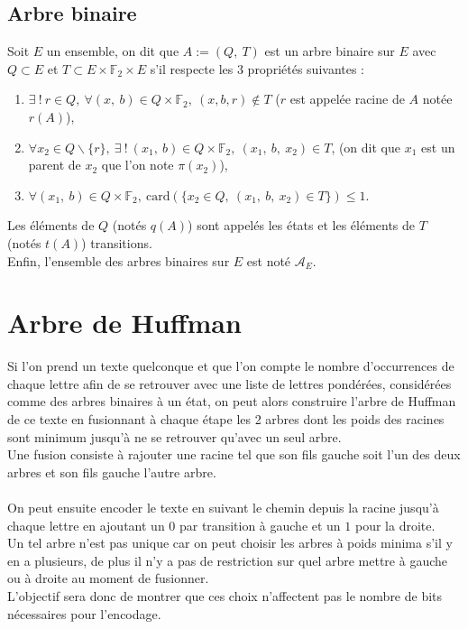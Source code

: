 \documentclass[a4paper, 12pt]{article}
\begin{document}
\subsection{Arbre binaire}
Soit $E$ un ensemble, on dit que $A := (Q,\ T)$ est un arbre binaire sur $E$ avec $Q \subset E$ et $T \subset E\times \mathbb{F}_2\times E$ s'il respecte les 3 propriétés suivantes :
\begin{enumerate}
\item $\exists \ !\ r \in Q,\ \forall (x,\ b) \in Q\times \mathbb{F}_2,\ (x, b, r) \notin T$ ($r$ est appelée racine de $A$ notée $r(A)$),
\item $\forall x_2 \in Q\backslash\{r\},\ \exists \ !\ (x_1,\ b) \in Q\times \mathbb{F}_2,\ (x_1,\ b,\ x_2) \in T$, (on dit que $x_1$ est un parent de $x_2$ que l'on note $\pi(x_2)$),
\item $\forall (x_1,\ b) \in Q\times \mathbb{F}_2,\ \text{card}(\{x_2 \in Q,\ (x_1,\ b,\ x_2)\in T\}) \leq 1$.
\end{enumerate}
Les éléments de $Q$ (notés $q(A)$) sont appelés les états et les éléments de $T$ (notés $t(A)$) transitions. \\
Enfin, l'ensemble des arbres binaires sur $E$ est noté $\mathcal{A}_E$.
\newpage

\section{Arbre de Huffman}

Si l'on prend un texte quelconque et que l'on compte le nombre d'occurrences de chaque lettre afin de se retrouver avec une liste de lettres pondérées, considérées comme des arbres binaires à un état, on peut alors construire l'arbre de Huffman de ce texte en fusionnant à chaque étape les 2 arbres dont les poids des racines sont minimum jusqu'à ne se retrouver qu'avec un seul arbre. \\
Une fusion consiste à rajouter une racine tel que son fils gauche soit l'un des deux arbres et son fils gauche l'autre arbre. \\ \\
On peut ensuite encoder le texte en suivant le chemin depuis la racine jusqu'à chaque lettre en ajoutant un $0$ par transition à gauche et un $1$ pour la droite. \\
Un tel arbre n'est pas unique car on peut choisir les arbres à poids minima s'il y en a plusieurs, de plus il n'y a pas de restriction sur quel arbre mettre à gauche ou à droite au moment de fusionner. \\
L'objectif sera donc de montrer que ces choix n'affectent pas le nombre de bits nécessaires pour l'encodage.
\end{document}
